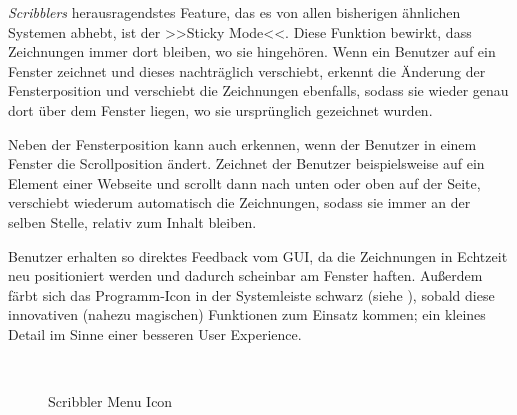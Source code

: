 \medskip \emph{Scribblers} herausragendstes Feature, das es von allen bisherigen ähnlichen Systemen abhebt, ist der >>Sticky Mode<<. Diese Funktion bewirkt, dass Zeichnungen immer dort bleiben, wo sie hingehören. Wenn ein Benutzer auf ein Fenster zeichnet und dieses nachträglich verschiebt, erkennt \scribbler die Änderung der Fensterposition und verschiebt die Zeichnungen ebenfalls, sodass sie wieder genau dort über dem Fenster liegen, wo sie ursprünglich gezeichnet wurden.

Neben der Fensterposition kann \scribbler auch erkennen, wenn der Benutzer in einem Fenster die Scrollposition ändert. Zeichnet der Benutzer beispielsweise auf ein Element einer Webseite und scrollt dann nach unten oder oben auf der Seite, verschiebt \scribbler wiederum automatisch die Zeichnungen, sodass sie immer an der selben Stelle, relativ zum Inhalt bleiben.

Benutzer erhalten so direktes Feedback vom GUI, da die Zeichnungen in Echtzeit neu positioniert werden und dadurch scheinbar am Fenster haften. Außerdem färbt sich das Programm-Icon in der Systemleiste schwarz (siehe ), sobald diese innovativen (nahezu magischen) Funktionen zum Einsatz kommen; ein kleines Detail im Sinne einer besseren User Experience. 

\begin{figure}
	\begin{center}
        \myfloatalign
         \quad
         \quad
		 \\
        \caption[Scribbler Menu Icon]{Scribbler Menu Icon}\label{fig:scribblerMenuIcon}
	\end{center}
\end{figure}


